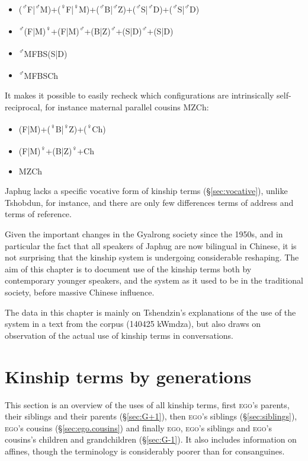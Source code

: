 \begin{itemize}
\item (\textsuperscript{♂}F|\textsuperscript{♂}M)+(\textsuperscript{♀}F|\textsuperscript{♀}M)+(\textsuperscript{♂}B|\textsuperscript{♂}Z)+(\textsuperscript{♂}S|\textsuperscript{♂}D)+(\textsuperscript{♂}S|\textsuperscript{♂}D)
\item \textsuperscript{♂}(F|M)\textsuperscript{♀}+(F|M)\textsuperscript{♂}+(B|Z)\textsuperscript{♂}+(S|D)\textsuperscript{♂}+(S|D)
\item \textsuperscript{♂}MFBS(S|D)
\item \textsuperscript{♂}MFBSCh
\end{itemize}
 
It makes it possible to easily recheck which configurations are intrinsically self-reciprocal, for instance maternal parallel cousins MZCh:

 \begin{itemize}
\item (F|M)+(\textsuperscript{♀}B|\textsuperscript{♀}Z)+(\textsuperscript{♀}Ch)
\item (F|M)\textsuperscript{♀}+(B|Z)\textsuperscript{♀}+Ch
\item MZCh
\end{itemize}
 

Japhug lacks a specific vocative form of kinship terms (§\ref{sec:vocative}), unlike Tshobdun, \citet[133]{jackson98morphology} for instance, and there are only few differences terms of address and terms of reference.

Given the important changes in the Gyalrong society since the 1950s, and in particular the fact that all speakers of Japhug are now bilingual in Chinese, it is not surprising that the kinship system is undergoing considerable reshaping. The aim of this chapter is to document use of the kinship terms both by contemporary younger speakers, and the system as it used to be in the traditional society, before massive Chinese influence.

The data in this chapter is mainly on Tshendzin's explanations of the use of the system in a text from the corpus (140425 kWmdza), but also draws on observation of the actual use of kinship terms in conversations.
 
 \section{Kinship terms by generations}  
 This section is an overview of the uses of all kinship terms, first  \textsc{ego}'s parents,  their siblings and their parents (§\ref{sec:G+1}), then \textsc{ego}'s siblings (§\ref{sec:siblings}), \textsc{ego}'s cousins (§\ref{sec:ego.cousins}) and finally  \textsc{ego}, \textsc{ego}'s siblings and \textsc{ego}'s cousins's children and grandchildren (§\ref{sec:G-1}). It also includes information on affines, though the terminology is considerably poorer than for consanguines.
 
